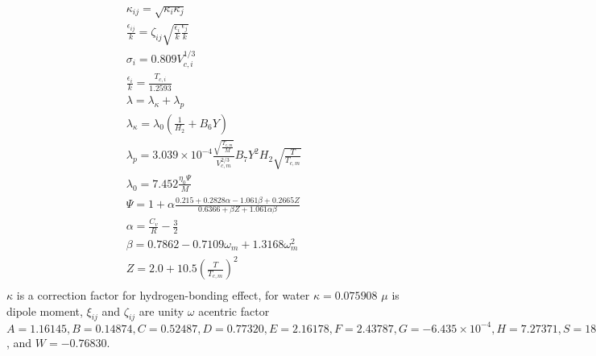 {\begin{align}
& \kappa_{ij} = \sqrt{\kappa_i \kappa_j}\\
& \frac{\epsilon_{ij}}{k} = \zeta_{ij} \sqrt{ \frac{\epsilon_{i}}{k} \frac{\epsilon_{j}}{k}}\\
& \sigma_i = 0.809 V_{c,i}^{1/3}\\
& \frac{\epsilon_i}{k} = \frac{T_{c,i}}{1.2593}\\
&\lambda = \lambda_{\kappa} +\lambda_p \\
&\lambda_{\kappa} = \lambda_0 \left( \frac{1}{H_2}+B_6 Y \right) \\
&\lambda_p = 3.039\times 10^{-4}\frac{\sqrt{\frac{ T_{c,m}}{M}}}{V_{c,m}^{2/3}}B_7Y^2H_2 \sqrt{\frac{T}{T_{c,m}}}\\
& \lambda_0=7.452 \frac{\eta_0\Psi}{M}\\
& \Psi = 1 +\alpha\frac{0.215 + 0.2828\alpha-1.061\beta+0.2665Z }{0.6366 +\beta Z +1.061\alpha \beta }\\
& \alpha = \frac{C_v}{R} -\frac{3}{2}\\
& \beta = 0.7862 - 0.7109 \omega_m + 1.3168 \omega_m^2\\
& Z =2.0+10.5 \left(\frac{T}{T_{c,m}}\right)^2\\
\end{align}
$\kappa$ is a correction factor for hydrogen-bonding effect, for water $\kappa=0.075 908$
$\mu$ is dipole moment,
$\xi_{ij}$ and $\zeta_{ij}$ are unity
$\omega$  acentric factor
$A = 1.16145, B = 0.14874, C = 0.52487, D = 0.77320, E = 2.16178, F = 2.43787, G = -6.435\times 10^{-4}, H = 7.273 71, S = 18.0323$, and $W = -0.768 30$.

}
